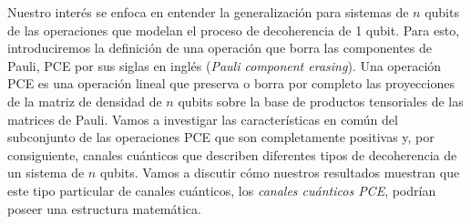 
Nuestro interés se enfoca en entender la generalización
para sistemas de $n$ qubits de las operaciones que modelan el proceso de 
decoherencia de 1 qubit. Para esto, introduciremos la definición de una 
operación que borra las componentes de Pauli, PCE por sus siglas en inglés
(\textit{Pauli component erasing}). Una operación PCE es una operación lineal 
que preserva o borra por completo las proyecciones de la matriz de densidad de $n$ qubits
sobre la base de productos tensoriales de las matrices de Pauli. Vamos a investigar 
las características en común del subconjunto de las operaciones PCE que son 
completamente positivas y, por consiguiente, canales cuánticos que describen
diferentes tipos de decoherencia de un sistema de $n$ qubits. Vamos a 
discutir cómo nuestros resultados muestran que este tipo particular de 
canales cuánticos, los \textit{canales cuánticos PCE}, podrían poseer 
una estructura matemática. 
